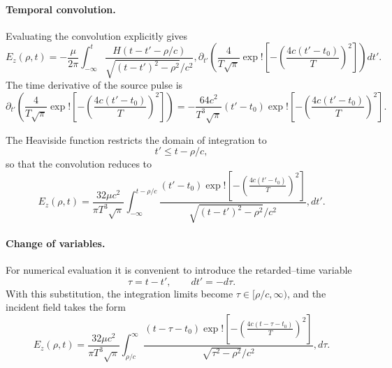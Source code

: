 \documentclass{article}
\begin{document}
\paragraph{Temporal convolution.} Evaluating the convolution explicitly gives \begin{equation} E_z(\rho,t) = -\frac{\mu}{2\pi} \int_{-\infty}^{t} \frac{H(t-t'-\rho/c)}{\sqrt{(t-t')^2-\rho^2}/c^2} , \partial_{t'} \left( \frac{4}{T\sqrt{\pi}} \exp!\left[-\left(\frac{4c(t'-t_0)}{T}\right)^2\right] \right) dt'. \end{equation} The time derivative of the source pulse is \begin{equation} \partial_{t'} \left( \frac{4}{T\sqrt{\pi}} \exp!\left[-\left(\frac{4c(t'-t_0)}{T}\right)^2\right] \right) = -\frac{64 c^2}{T^3\sqrt{\pi}} (t'-t_0) \exp!\left[-\left(\frac{4c(t'-t_0)}{T}\right)^2\right]. \end{equation}

The Heaviside function restricts the domain of integration to \begin{equation} t' \le t-\rho/c, \end{equation} so that the convolution reduces to \begin{equation} E_z(\rho,t) = \frac{32\mu c^2}{\pi T^3\sqrt{\pi}} \int_{-\infty}^{t-\rho/c} \frac{(t'-t_0) \exp!\left[-\left(\frac{4c(t'-t_0)}{T}\right)^2\right]}{\sqrt{(t-t')^2-\rho^2}/c^2} , dt'. \end{equation}

\paragraph{Change of variables.} For numerical evaluation it is convenient to introduce the retarded--time variable \begin{equation} \tau = t - t', \qquad dt' = - d\tau. \end{equation} With this substitution, the integration limits become $\tau \in [\rho/c,\infty)$, and the incident field takes the form \begin{equation} E_z(\rho,t) = \frac{32\mu c^2}{\pi T^3\sqrt{\pi}} \int_{\rho/c}^{\infty} \frac{(t-\tau-t_0) \exp!\left[-\left(\frac{4c(t-\tau-t_0)}{T}\right)^2\right]}{\sqrt{\tau^2-\rho^2}/c^2} , d\tau. \end{equation}
\end{document}
